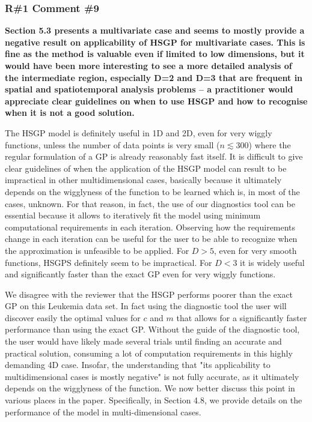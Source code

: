 \documentclass[11pt]{report}
\begin{document}
\subsubsection*{R\#1 Comment \#9}

\textbf{Section 5.3 presents a multivariate case and seems to mostly provide a negative result on applicability of HSGP for multivariate cases. This is fine as the method is valuable even if limited to low dimensions, but it would have been more interesting to see a more detailed analysis of the intermediate region, especially D=2 and D=3 that are frequent in spatial and spatiotemporal analysis problems -- a practitioner would appreciate clear guidelines on when to use HSGP and how to recognise when it is not a good solution.}

The HSGP model is definitely useful in 1D and 2D, even for very wiggly functions, unless the number of data points is very small ($n \lesssim 300$) where the regular formulation of a GP is already reasonably fast itself.
It is difficult to give clear guidelines of when the application of the HSGP model can result to be impractical in other multidimensional cases, basically because it ultimately depends on the wigglyness of the function to be learned which is, in most of the cases, unknown. For that reason, in fact, the use of our diagnostics tool can be essential because it allows to iteratively fit the model using minimum computational requirements in each iteration. Observing how the requirements change in each iteration can be useful for the user to be able to recognize when the approximation is unfeasible to be applied. For $D>5$, even for very smooth functions, HSGPS definitely seem to be impractical. For $D<3$ it is widely useful and significantly faster than the exact GP even for very wiggly functions.

We disagree with the reviewer that the HSGP performs poorer than the exact GP on this Leukemia data set. In fact using the diagnostic tool the user will discover easily the optimal values for $c$ and $m$ that allows for a significantly faster performance than using the exact GP. Without the guide of the diagnostic tool, the user would have likely made several trials until finding an accurate and practical solution, consuming a lot of computation requirements in this highly demanding 4D case. Insofar, the understanding that "its applicability to multidimensional cases is mostly negative" is not fully accurate, as it ultimately depends on the wigglyness of the function. We now better discuss this point in various places in the paper. Specifically, in Section 4.8, we provide details on the performance of the model in multi-dimensional cases. 
\end{document}
